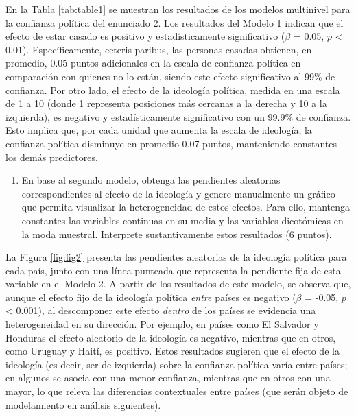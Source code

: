 \documentclass[
  12pt,
  a4paper,
]{article}
\providecommand{\tightlist}{%
  \setlength{\itemsep}{0pt}\setlength{\parskip}{0pt}}
\begin{document}
En la Tabla \ref{tab:table1} se muestran los resultados de los modelos multinivel para la confianza política del enunciado 2. Los resultados del Modelo 1 indican que el efecto de estar casado es positivo y estadísticamente significativo (\(\beta\) = 0.05, \(p\) \textless{} 0.01). Específicamente, ceteris paribus, las personas casadas obtienen, en promedio, 0.05 puntos adicionales en la escala de confianza política en comparación con quienes no lo están, siendo este efecto significativo al 99\% de confianza. Por otro lado, el efecto de la ideología política, medida en una escala de 1 a 10 (donde 1 representa posiciones más cercanas a la derecha y 10 a la izquierda), es negativo y estadísticamente significativo con un 99.9\% de confianza. Esto implica que, por cada unidad que aumenta la escala de ideología, la confianza política disminuye en promedio 0.07 puntos, manteniendo constantes los demás predictores.

\begin{enumerate}
\def\labelenumi{\alph{enumi})}
\setcounter{enumi}{3}
\tightlist
\item
  En base al segundo modelo, obtenga las pendientes aleatorias correspondientes al efecto de la ideología y genere manualmente un gráfico que permita visualizar la heterogeneidad de estos efectos. Para ello, mantenga constantes las variables continuas en su media y las variables dicotómicas en la moda muestral. Interprete sustantivamente estos resultados (6 puntos).
\end{enumerate}

La Figura \ref{fig:fig2} presenta las pendientes aleatorias de la ideología política para cada país, junto con una línea punteada que representa la pendiente fija de esta variable en el Modelo 2. A partir de los resultados de este modelo, se observa que, aunque el efecto fijo de la ideología política \emph{entre} países es negativo (\(\beta\) = -0.05, \(p\) \textless{} 0.001), al descomponer este efecto \emph{dentro} de los países se evidencia una heterogeneidad en su dirección. Por ejemplo, en países como El Salvador y Honduras el efecto aleatorio de la ideología es negativo, mientras que en otros, como Uruguay y Haití, es positivo. Estos resultados sugieren que el efecto de la ideología (es decir, ser de izquierda) sobre la confianza política varía entre países; en algunos se asocia con una menor confianza, mientras que en otros con una mayor, lo que releva las diferencias contextuales entre países (que serán objeto de modelamiento en análisis siguientes).
\end{document}
